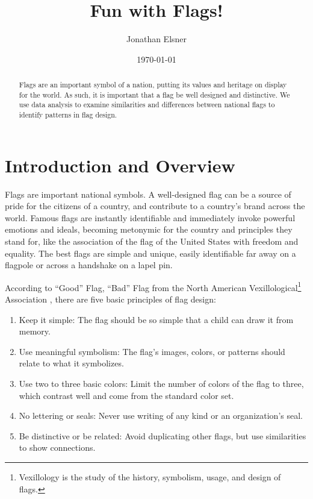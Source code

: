 \documentclass[11pt]{amsart}
\title{Fun with Flags!}
\author{Jonathan Elsner} %
\date{\today} %
\begin{document}
\begin{abstract}
    Flags are an important symbol of a nation, putting its values and heritage on display for the world. As such, it is important that a flag be well designed and distinctive. We use data analysis to examine similarities and differences between national flags to identify patterns in flag design.
\end{abstract}

\maketitle 

\section{Introduction and Overview}\label{sec:Introduction}

Flags are important national symbols. A well-designed flag can be a source of
pride for the citizens of a country, and contribute to a country's brand across
the world. Famous flags are instantly identifiable and immediately invoke
powerful emotions and ideals, becoming metonymic for the country and principles
they stand for, like the association of the flag of the United States with
freedom and equality. The best flags are simple and unique, easily identifiable
far away on a flagpole or across a handshake on a lapel pin.

According to ``Good'' Flag, ``Bad'' Flag from the North American
Vexillological\footnote{Vexillology is the study of the history, symbolism, usage,
and design of flags.} Association \cite{good-flag-bad-flag}, there are five
basic principles of flag design:
\begin{enumerate}
    \item Keep it simple: The flag should be so simple that a child can draw it
    from memory.
    \item Use meaningful symbolism: The flag's images, colors, or patterns
    should relate to what it symbolizes.
    \item Use two to three basic colors: Limit the number of colors of the flag
    to three, which contrast well and come from the standard color set.
    \item No lettering or seals: Never use writing of any kind or an
    organization's seal.
    \item Be distinctive or be related: Avoid duplicating other flags, but use
    similarities to show connections.
\end{enumerate}
\end{document}
